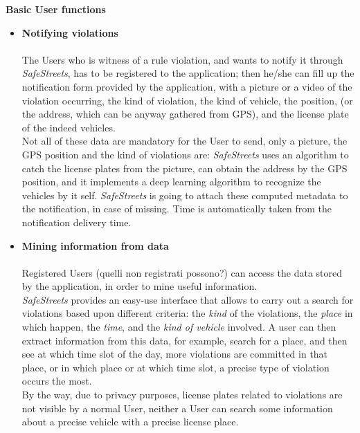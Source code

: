 \textbf{Basic User functions} \\
\begin{itemize}
    \item \textbf{Notifying violations}\\\\
    The Users who is witness of a rule violation, and wants to notify it through \textit{SafeStreets}, has to be registered to the application; then he/she can fill up the notification form provided by the application, with a picture or a video of the violation occurring, the kind of violation, the kind of vehicle, the position, (or the address, which can be anyway gathered from GPS), and the license plate of the indeed vehicles.\\
    Not all of these data are mandatory for the User to send, only a picture, the GPS position and the kind of violations are: \textit{SafeStreets} uses an algorithm to catch the license plates from the picture, can obtain the address by the GPS position, and it implements a deep learning algorithm to recognize the vehicles by it self. \textit{SafeStreets} is going to attach these computed metadata to the notification, in case of missing. Time is automatically taken from the notification delivery time.
    
    \item\textbf{Mining information from data}\\\\
    Registered Users (quelli non registrati possono?) can access the  data stored by the application, in order to mine useful information. \\ \textit{SafeStreets} provides an easy-use interface that allows to  carry out a search for violations based upon different criteria: the \textit{kind} of the violations, the \textit{place} in which happen, the \textit{time}, and the \textit{kind of vehicle} involved. 
    A user can then extract information from this data, for example, search for a place, and then see at which time slot of the day, more violations are committed in that place, or in which place or at which time slot, a precise type of violation occurs the most.\\
    By the way, due to privacy purposes, license plates related to violations are not visible by a normal User, neither a User can search some information about a precise vehicle with a precise license place.
    
    \end{itemize}  
    
